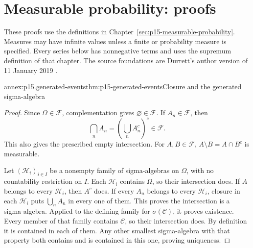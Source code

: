 \section{Measurable probability: proofs}
\label{sec:annex-p15-measurable-probability}

These proofs use the definitions in
Chapter~\ref{sec:p15-measurable-probability}. Measures may have infinite
values unless a finite or probability measure is specified. Every series
below has nonnegative terms and uses the supremum definition of that
chapter. The source foundations are Durrett's author version of
11 January 2019 \cite[secs.~1.1--1.3; app.~A.1]{DurrettPTEAuthor2019}.

\begin{annexitem}{annex:p15.generated-events}{thm:p15-generated-events}{Closure and the generated sigma-algebra}
\begin{proof}
Since \(\Omega\in\mathcal F\), complementation gives
\(\varnothing\in\mathcal F\). If \(A_n\in\mathcal F\), then
\[
 \bigcap_n A_n=\left(\bigcup_n A_n^c\right)^c\in\mathcal F.
\]
This also gives the prescribed empty intersection. For \(A,B\in\mathcal F\),
\(A\setminus B=A\cap B^c\) is measurable.

Let \((\mathcal H_i)_{i\in I}\) be a nonempty family of sigma-algebras
on \(\Omega\), with no countability restriction on \(I\). Each
\(\mathcal H_i\) contains \(\Omega\), so their intersection does.
If \(A\) belongs to every \(\mathcal H_i\), then \(A^c\) does.
If every \(A_n\) belongs to every \(\mathcal H_i\), closure in each
\(\mathcal H_i\) puts \(\bigcup_n A_n\) in every one of them.
This proves the intersection is a sigma-algebra. Applied to the defining
family for \(\sigma(\mathcal C)\), it proves existence. Every member
of that family contains \(\mathcal C\), so their intersection does.
By definition it is contained in each of them. Any other smallest
sigma-algebra with that property both contains and is contained in this
one, proving uniqueness.
\end{proof}
\end{annexitem}

